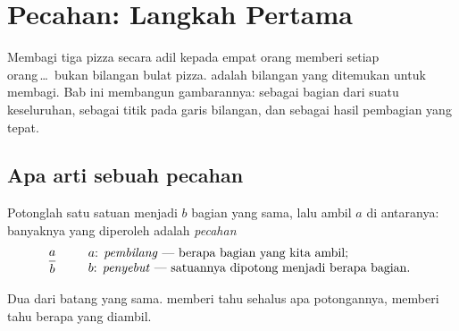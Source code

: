 \chapter{Pecahan: Langkah Pertama}\label{ch:g6:fractions}

Membagi tiga pizza secara adil kepada empat orang memberi setiap
orang\,\dots\ bukan bilangan bulat pizza.  adalah bilangan yang
ditemukan untuk membagi. Bab ini membangun gambarannya: 
sebagai bagian dari suatu keseluruhan, sebagai titik pada garis
bilangan, dan sebagai hasil pembagian yang tepat.

\section{Apa arti sebuah pecahan}

\begin{definition}[Pecahan]\label{def:g6:fractions:def}
Potonglah satu satuan menjadi $b$ bagian yang sama, lalu ambil $a$ di
antaranya: banyaknya yang diperoleh adalah \emph{pecahan}
\[
\frac{a}{b}
\qquad
\begin{array}{l}
a \text{: \emph{pembilang} --- berapa bagian yang kita ambil;}\\
b \text{: \emph{penyebut} --- satuannya dipotong menjadi berapa bagian.}
\end{array}
\]
\end{definition}

\begin{omfigure}

{\small Dua  dari batang yang sama.  memberi tahu
sehalus apa potongannya,  memberi tahu berapa yang diambil.}
\end{omfigure}

